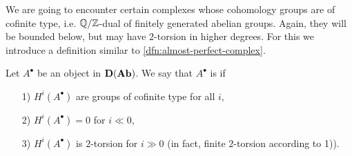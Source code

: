 
We are going to encounter certain complexes whose cohomology groups are of
cofinite type, i.e. $\mathbb{Q}/\mathbb{Z}$-dual of finitely generated abelian groups. Again,
they will be bounded below, but may have $2$-torsion in higher degrees. For this
we introduce a definition similar to \ref{dfn:almost-perfect-complex}.

\begin{definition}
  \label{dfn:almost-cofinite-type-complex} Let $A^\bullet$ be an object in
  $\text{\bf D} (\text{\bf Ab})$. We say that $A^\bullet$ is
   if

  \begin{enumerate}
  \item[1)] $H^i (A^\bullet)$ are groups of cofinite type for all $i$,

  \item[2)] $H^i (A^\bullet) = 0$ for $i \ll 0$,

  \item[3)] $H^i (A^\bullet)$ is $2$-torsion for $i \gg 0$ (in fact, finite
    $2$-torsion according to 1)).
  \end{enumerate}
\end{definition}

